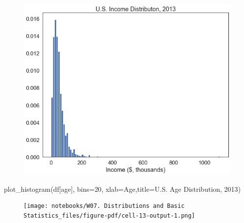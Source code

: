 \documentclass[
  letterpaper,
  DIV=11,
  numbers=noendperiod]{scrreprt}
\newenvironment{Shaded}{\begin{snugshade}}{\end{snugshade}}
\newcommand{\DecValTok}[1]{\textcolor[rgb]{0.68,0.00,0.00}{#1}}
\newcommand{\NormalTok}[1]{\textcolor[rgb]{0.00,0.23,0.31}{#1}}
\newcommand{\OperatorTok}[1]{\textcolor[rgb]{0.37,0.37,0.37}{#1}}
\newcommand{\StringTok}[1]{\textcolor[rgb]{0.13,0.47,0.30}{#1}}
\begin{document}
\begin{figure}[H]

{\centering \includegraphics{notebooks/W07. Distributions and Basic Statistics_files/figure-pdf/cell-12-output-1.png}

}

\end{figure}

\begin{Shaded}
\begin{Highlighting}[]
\NormalTok{plot\_histogram(df[}\StringTok{\textquotesingle{}age\textquotesingle{}}\NormalTok{], bins}\OperatorTok{=}\DecValTok{20}\NormalTok{, xlab}\OperatorTok{=}\StringTok{\textquotesingle{}Age\textquotesingle{}}\NormalTok{,title}\OperatorTok{=}\StringTok{\textquotesingle{}U.S. Age Distribution, 2013\textquotesingle{}}\NormalTok{)}
\end{Highlighting}
\end{Shaded}

\begin{figure}[H]

{\centering \texttt{[image: notebooks/W07. Distributions and Basic Statistics\_files/figure-pdf/cell-13-output-1.png]}

}

\end{figure}
\end{document}
